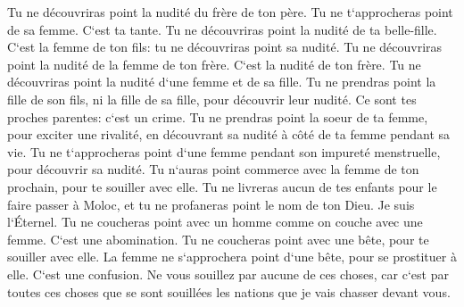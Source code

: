 \verse Tu ne découvriras point la nudité du frère de ton père. Tu ne t`approcheras point de sa femme. C`est ta tante. 
\verse Tu ne découvriras point la nudité de ta belle-fille. C`est la femme de ton fils: tu ne découvriras point sa nudité. 
\verse Tu ne découvriras point la nudité de la femme de ton frère. C`est la nudité de ton frère. 
\verse Tu ne découvriras point la nudité d`une femme et de sa fille. Tu ne prendras point la fille de son fils, ni la fille de sa fille, pour découvrir leur nudité. Ce sont tes proches parentes: c`est un crime. 
\verse Tu ne prendras point la soeur de ta femme, pour exciter une rivalité, en découvrant sa nudité à côté de ta femme pendant sa vie. 
\verse Tu ne t`approcheras point d`une femme pendant son impureté menstruelle, pour découvrir sa nudité. 
\verse Tu n`auras point commerce avec la femme de ton prochain, pour te souiller avec elle. 
\verse Tu ne livreras aucun de tes enfants pour le faire passer à Moloc, et tu ne profaneras point le nom de ton Dieu. Je suis l`Éternel. 
\verse Tu ne coucheras point avec un homme comme on couche avec une femme. C`est une abomination. 
\verse Tu ne coucheras point avec une bête, pour te souiller avec elle. La femme ne s`approchera point d`une bête, pour se prostituer à elle. C`est une confusion. 
\verse Ne vous souillez par aucune de ces choses, car c`est par toutes ces choses que se sont souillées les nations que je vais chasser devant vous. 
